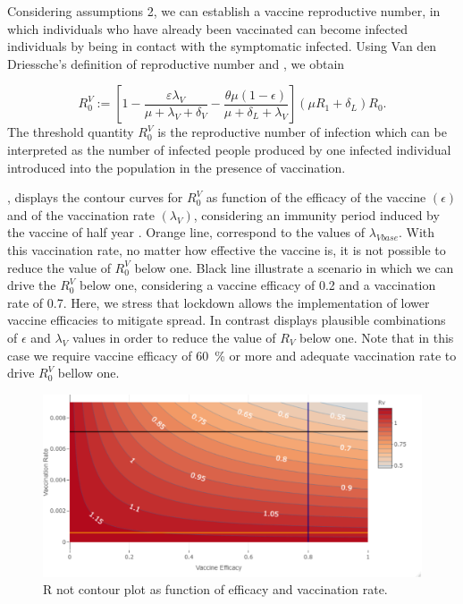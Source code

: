 Considering assumptions 2, we can establish a vaccine reproductive number,
in which individuals who have already been vaccinated
can become infected individuals by being in contact with the
symptomatic infected. Using Van den Driessche’s \cite{VandenDriessche2017a}
definition of reproductive number and \cite{Alexander2004}, we obtain

\begin{equation*}
    R_{0}^V := \left[ 1-\frac{\varepsilon \lambda_V}
    {\mu+\lambda_V+\delta_V}
    -\frac{\theta\mu(1-\epsilon)}{\mu+\delta_L+\lambda_V}\right]
    (\mu R_1+\delta_L)R_0.
\end{equation*}
%
The threshold quantity $R_0^V$ is the reproductive number of infection
which can be interpreted as the number of infected people produced
by one infected individual introduced into the population in the
presence of vaccination.

, displays the contour curves for $ R_0^V $ as function
of the efficacy of the vaccine $ (\epsilon) $ and of the vaccination rate $
(\lambda_V) $,
considering an immunity period induced by the vaccine of half year . Orange
line, correspond to the values of $\lambda_{Vbase}$. With this vaccination
rate, no matter how effective the vaccine is, it is not possible
to reduce the value of $R_0^V$ below one. Black line illustrate a scenario in
which we can drive the $R_0^V$  below one, considering a vaccine
efficacy of \num{0.2} and a  vaccination rate of \num{0.7}.
Here, we stress that lockdown allows the implementation of lower vaccine
efficacies to mitigate spread.
In contrast  displays  plausible
combinations of $\epsilon$ and $\lambda_V$ values
in order to reduce the value of $R_V$ below one. Note that in this case
we require vaccine efficacy of \SI{60}{\percent} or more and
adequate vaccination rate to drive $R_0^V$ bellow one.




\begin{figure}[tbh]
    \centering
      \includegraphics[scale=0.5, keepaspectratio]{Figures/Rv_contour}
    \caption{R not contour plot as function of efficacy and vaccination rate.}
    \label{fig:rvcontour1}
\end{figure}

